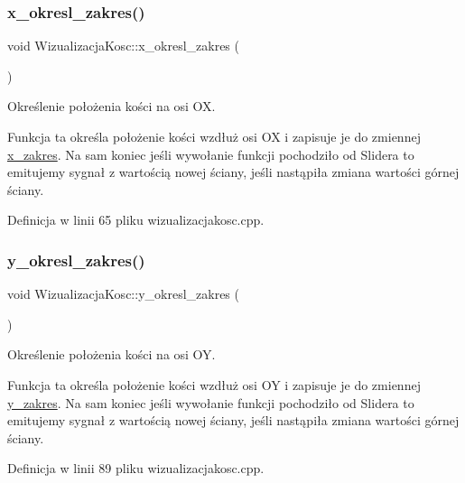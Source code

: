\subsubsection{\texorpdfstring{x\+\_\+okresl\+\_\+zakres()}{x\_okresl\_zakres()}}
{\footnotesize\ttfamily void Wizualizacja\+Kosc\+::x\+\_\+okresl\+\_\+zakres (\begin{DoxyParamCaption}{ }\end{DoxyParamCaption})}



Określenie położenia kości na osi OX. 

Funkcja ta określa położenie kości wzdłuż osi OX i zapisuje je do zmiennej \hyperlink{class_wizualizacja_kosc_aba059f3a46ffb74158786d2e74f34c94}{x\+\_\+zakres}. Na sam koniec jeśli wywołanie funkcji pochodziło od Slidera to emitujemy sygnał z wartością nowej ściany, jeśli nastąpiła zmiana wartości górnej ściany. 

Definicja w linii 65 pliku wizualizacjakosc.\+cpp.

\mbox{\label{class_wizualizacja_kosc_af254ebd2a7a13dc033dc48881c059c4b}} 
\subsubsection{\texorpdfstring{y\+\_\+okresl\+\_\+zakres()}{y\_okresl\_zakres()}}
{\footnotesize\ttfamily void Wizualizacja\+Kosc\+::y\+\_\+okresl\+\_\+zakres (\begin{DoxyParamCaption}{ }\end{DoxyParamCaption})}



Określenie położenia kości na osi OY. 

Funkcja ta określa położenie kości wzdłuż osi OY i zapisuje je do zmiennej \hyperlink{class_wizualizacja_kosc_a61ee2d767b712866f93710c29cdd051d}{y\+\_\+zakres}. Na sam koniec jeśli wywołanie funkcji pochodziło od Slidera to emitujemy sygnał z wartością nowej ściany, jeśli nastąpiła zmiana wartości górnej ściany. 

Definicja w linii 89 pliku wizualizacjakosc.\+cpp.

\mbox{\label{class_wizualizacja_kosc_a01b68ff7aad0d8170bc675b988b0e2d6}} 
